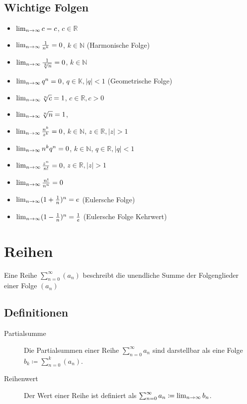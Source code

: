     \section{Wichtige Folgen}
        \begin{itemize}
            \item $ \lim_{n \to \infty} c = c $, $ c \in \mathbb{R} $
            \item $ \lim_{n \to \infty} \frac{1}{n ^ k} = 0 $, $ k \in \mathbb{N} $ (Harmonische Folge)
            \item $ \lim_{n \to \infty} \frac{1}{\sqrt[k]{n}} = 0 $, $ k \in \mathbb{N} $
            \item $ \lim_{n \to \infty} q ^ n = 0 $, $ q \in \mathbb{K}, \lvert q \rvert < 1 $ (Geometrische Folge)
            \item $ \lim_{n \to \infty} \sqrt[n]{c} = 1 $, $ c \in \mathbb{R}, c > 0 $
            \item $ \lim_{n \to \infty} \sqrt[n]{n} = 1 $,
            \item $ \lim_{n \to \infty} \frac{n ^ k}{z ^ k} = 0 $, $ k \in \mathbb{N} $, $ z \in \mathbb{R}, \lvert z \rvert > 1 $
            \item $ \lim_{n \to \infty} n ^ k q ^ n = 0 $, $ k \in \mathbb{N} $, $ q \in \mathbb{R}, \lvert q \rvert < 1 $
            \item $ \lim_{n \to \infty} \frac{z ^ n}{n!} = 0 $, $ z \in \mathbb{R}, \lvert z \rvert > 1 $
            \item $ \lim_{n \to \infty} \frac{n!}{n ^ n} = 0 $
            \item $ \lim_{n \to \infty} (1 + \frac{1}{n}) ^ n = e $ (Eulersche Folge)
	\item $ \lim_{n \to \infty} (1 - \frac{1}{n}) ^ n = \frac{1}{e} $ (Eulersche Folge Kehrwert)
        \end{itemize}

\chapter{Reihen}
    Eine Reihe $ \sum _ { n = 0 } ^ \infty (a _ n) $ beschreibt die unendliche Summe der Folgenglieder einer Folge $ (a _ n) $

    \section{Definitionen}
        \begin{description}
            \item[Partialsumme] Die Partialsummen einer Reihe $ \sum _ { n = 0 } ^ \infty a _ n $ sind darstellbar als eine Folge $ b _ k \coloneqq \sum _ { n = 0 } ^ k (a _ n) $.
            \item[Reihenwert] Der Wert einer Reihe ist definiert als $ \sum _ { n = 0 } ^ \infty a _ n \coloneqq \lim_{n \to \infty} b _ n $.
        \end{description}

